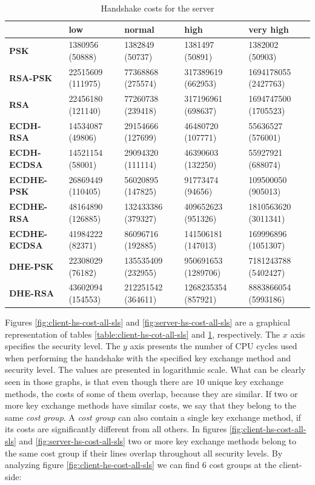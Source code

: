 \documentclass{llncs}
\begin{document}
  \begin{table}[]
\begin{tabular}{|l|l|l|l|l|}
\hline
                     & \textbf{low}      & \textbf{normal}    & \textbf{high}       & \textbf{very high}   \\ \hline
\textbf{PSK}         & 1380956 (50888)   & 1382849 (50737)    & 1381497 (50891)     & 1382002 (50903)      \\ \hline
\textbf{RSA-PSK}     & 22515609 (111975) & 77368868 (275574)  & 317389619 (662953)  & 1694178055 (2427763) \\ \hline
\textbf{RSA}         & 22456180 (121140) & 77260738 (239418)  & 317196961 (698637)  & 1694747500 (1705523) \\ \hline
\textbf{ECDH-RSA}    & 14534087 (49806)  & 29154666 (127699)  & 46480720 (107771)   & 55636527 (576001)    \\ \hline
\textbf{ECDH-ECDSA}  & 14521154 (58001)  & 29094320 (111114)  & 46390603 (132250)   & 55927921 (688074)    \\ \hline
\textbf{ECDHE-PSK}   & 26869449 (110405) & 56020895 (147825)  & 91773474 (94656)    & 109500050 (905013)   \\ \hline
\textbf{ECDHE-RSA}   & 48164890 (126885) & 132433386 (379327) & 409652623 (951326)  & 1810563620 (3011341) \\ \hline
\textbf{ECDHE-ECDSA} & 41984222 (82371)  & 86096716 (192885)  & 141506181 (147013)  & 169996896 (1051307)  \\ \hline
\textbf{DHE-PSK}     & 22308029 (76182)  & 135535409 (232955) & 950691653 (1289706) & 7181243788 (5402427) \\ \hline
\textbf{DHE-RSA}     & 43602094 (154553) & 212251542 (364611) & 1268235354 (857921) & 8883866054 (5993186) \\ \hline
\end{tabular}
  \centering \centering \caption{\label{table:server-hs-cost-all-sls} Handshake costs for the server}
\end{table}

Figures \ref{fig:client-hs-cost-all-sls} and \ref{fig:server-hs-cost-all-sls} are a graphical representation of tables \ref{table:client-hs-cot-all-sls}
and \ref{table:server-hs-cost-all-sls}, respectively. The $x$ axis specifies the security level. The $y$ axis presents the number
of CPU cycles used when performing the handshake with the specified key exchange method and security level.
The values are presented in logarithmic scale.  What can be clearly seen in those
graphs, is that even though there are $10$ unique key exchange methods, the costs of some of them overlap, because they are similar.
If two or more key exchange methods have similar costs, we say that they belong to the same \textit{cost group}. A \textit{cost group}
can also contain a single key exchange method, if its costs are significantly different from all others. In figures
\ref{fig:client-hs-cost-all-sls} and \ref{fig:server-hs-cost-all-sls} two or more key exchange methods belong to the same
cost group if their lines overlap throughout all security levels. By analyzing figure \ref{fig:client-hs-cost-all-sls} we can
find $6$ cost groups at the client-side:
\end{document}
